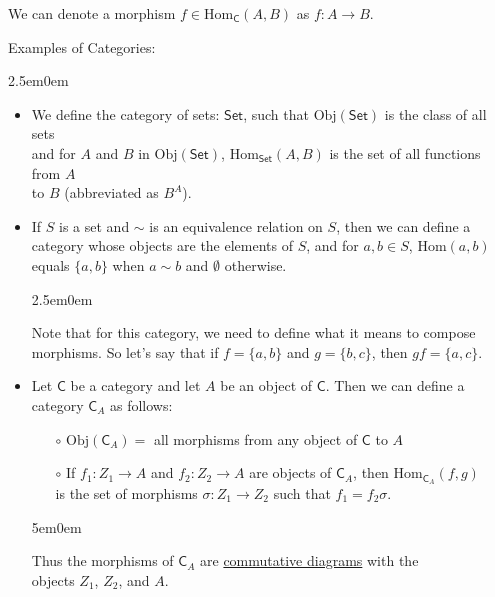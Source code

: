 \documentclass{book}
\newcommand{\exOne}{%
   \color{Purple}%
   \fontsize{14}{16}\selectfont%
}
\newcommand{\exTwo}{%
   \color{RedViolet}%
   \fontsize{13}{15}\selectfont%
}
\newcommand{\exP}{%
   \color{VioletRed}%
   \fontsize{12}{14}\selectfont%
}
\newenvironment{myIndent}{%
   \begin{adjustwidth}{2.5em}{0em}%
}{%
   \end{adjustwidth}%
}
\newenvironment{myDindent}{%
   \begin{adjustwidth}{5em}{0em}%
}{%
   \end{adjustwidth}%
}
\newcommand{\myObj}{\mathrm{Obj}}
\newcommand{\myHom}{\mathrm{Hom}}
\newcommand{\mcateg}[1]{\mathsf{#1}}
\newcommand{\retTwo}{\hfill\bigbreak}
\begin{document}
   We can denote a morphism $f \in \myHom_\mcateg{C}(A, B)$ as $f: A \rightarrow B$.\retTwo

   \exOne
   Examples of Categories:
   \begin{myIndent} \exTwo
      \begin{itemize}
         \item We define the category of sets: $\mcateg{Set}$, such that $\myObj(\mcateg{Set})$ is the class of all sets\\ and for $A$ and $B$ in $\myObj(\mcateg{Set})$, $\myHom_\mcateg{Set}(A, B)$ is the set of all functions from $A$\\ to $B$ (abbreviated as $B^A$).\newpage
         
         \item If $S$ is a set and $\sim$ is an equivalence relation on $S$, then we can define a\\ category whose objects are the elements of $S$, and for $a, b \in S$, $\myHom(a, b)$\\ equals $\{a, b\}$ when $a \sim b$ and $\emptyset$ otherwise.
         {\begin{myIndent} \exP
            Note that for this category, we need to define what it means to compose\\ morphisms. So let's say that if $f = \{a, b\}$ and $g = \{b, c\}$, then $gf = \{a, c\}$.\retTwo
         \end{myIndent}}

         \item Let $\mcateg{C}$ be a category and let $A$ be an object of $\mcateg{C}$. Then we can define a category $\mcateg{C}_A$ as follows:
         \begin{itemize}
            \item[$\circ$] $\myObj(\mcateg{C}_A) =$ all morphisms from any object of $\mcateg{C}$ to $A$
            \item[$\circ$] If $f_1: Z_1 \longrightarrow A$ and $f_2: Z_2 \longrightarrow A$ are objects of $\mcateg{C}_A$, then $\myHom_{\mcateg{C}_A}(f, g)$\\ is the set of morphisms $\sigma: Z_1 \rightarrow Z_2$ such that $f_1 = f_2\sigma$.
         \end{itemize}
         {\begin{myDindent} \exP
            Thus the morphisms of $\mcateg{C}_A$ are \ul{commutative diagrams} with the\\ objects $Z_1$, $Z_2$, and $A$.\\ [-12pt]


\end{myDindent}}
\end{itemize}
\end{myIndent}
\end{document}
